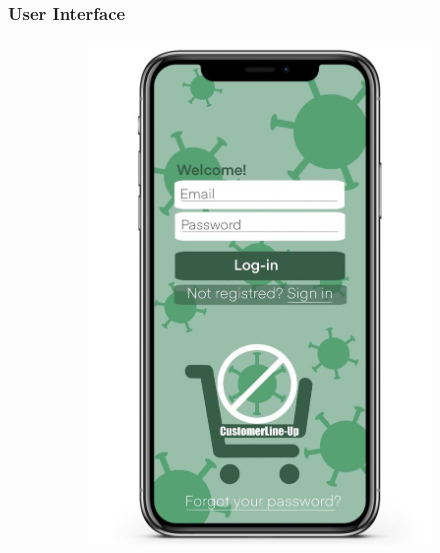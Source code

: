 \documentclass[a4paper, 10pt, oneside]{article}
\begin{document}
\subsubsection{User Interface}
\begin{figure}[hbt]
\centering
\begin{subfigure}
	\centering
  	\includegraphics[height=0.3\textheight, scale=0.2, keepaspectratio]{img/GUI/login.jpg} 
 \end{subfigure}
 \begin{subfigure}
	\centering

\end{subfigure}
\end{figure}
\end{document}
